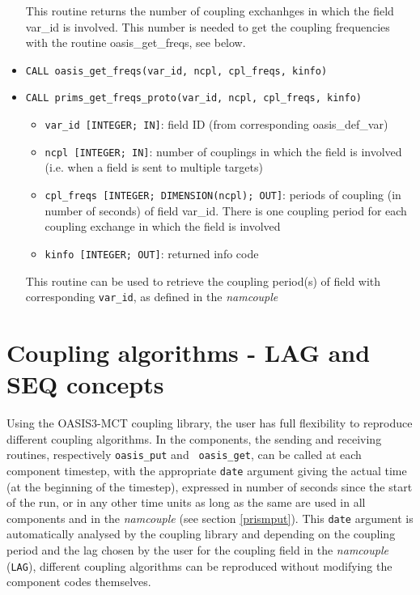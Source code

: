 \begin{itemize}
This routine returns the number of coupling exchanhges in which the field var\_id is
involved. This number is needed to get the coupling frequencies with the
routine oasis\_get\_freqs, see below.

\item {\tt CALL oasis\_get\_freqs(var\_id, ncpl, cpl\_freqs, kinfo)}
\item {\tt CALL prims\_get\_freqs\_proto(var\_id, ncpl, cpl\_freqs, kinfo)}
  \begin{itemize}
  \item {\tt var\_id [INTEGER; IN]}: field ID (from
  corresponding oasis\_def\_var)
  \item {\tt ncpl [INTEGER; IN]}: number of couplings in which the field
  is involved (i.e. when a field is sent to multiple targets)
   \item {\tt cpl\_freqs [INTEGER; DIMENSION(ncpl); OUT]}: periods of coupling 
  (in number of seconds) of field var\_id. There is one coupling period for
  each coupling exchange in which the field is involved
  \item {\tt kinfo [INTEGER; OUT]}: returned info code
  \end{itemize}

This routine can be used to retrieve the coupling period(s) of field with
corresponding {\tt var\_id}, as defined in the {\it namcouple}

\end{itemize}

\section{Coupling algorithms - LAG and SEQ concepts}
\label{subsubsec_Algoritms}

Using the OASIS3-MCT coupling library, the user has full flexibility
to reproduce different coupling algorithms. In the components, the
sending and receiving routines, respectively {\tt oasis\_put} and {\tt
  oasis\_get}, can be called at each component timestep, with the
appropriate {\tt date} argument giving the actual time (at the
beginning of the timestep), expressed in number of seconds since the
start of the run, or in any other time units as long as the same are
used in all components and in the {\it namcouple} (see section
\ref{prismput}). This {\tt date} argument is automatically analysed by
the coupling library and depending on the coupling period and the lag chosen by the user for the coupling field in the {\it namcouple} ({\tt LAG}), different coupling algorithms can be reproduced
without modifying the component codes themselves.

